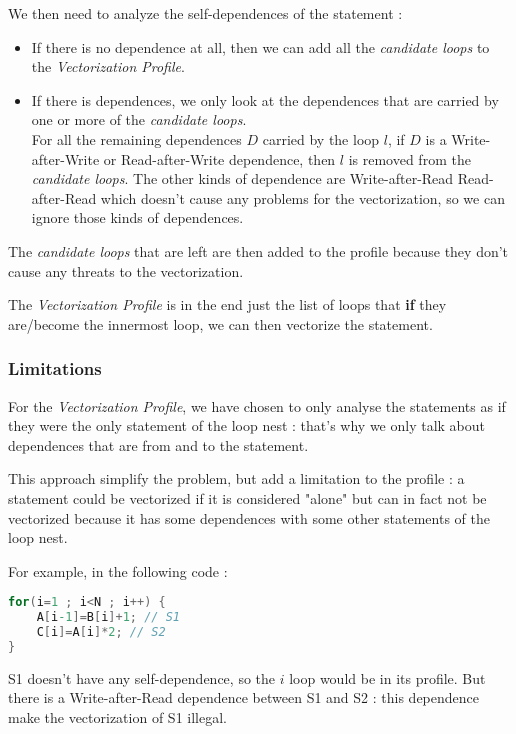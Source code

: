\documentclass[paper=a4, fontsize=11pt]{scrartcl}
\numberwithin{equation}{section}        %
\numberwithin{figure}{section}          %
\numberwithin{table}{section}               %
\begin{document}
        \bigskip

        We then need to analyze the \glspl{self-dependence} of the statement :
        \begin{itemize}
            \item If there is no dependence at all, then we can add all the 
                \textit{candidate loops} to the \textit{Vectorization Profile}.
            \item If there is dependences, we only look at the dependences that
                are carried by one or more of the \textit{candidate loops}.\\
                For all the remaining dependences $D$ carried by the loop $l$,
                if $D$ is a Write-after-Write or Read-after-Write dependence, then $l$
                is removed from the \textit{candidate loops}.
                The other kinds of dependence are Write-after-Read Read-after-Read 
                which doesn't cause any problems for the vectorization, so we can ignore
                those kinds of dependences.
        \end{itemize}
        The \textit{candidate loops} that are left are then added to the profile because they
        don't cause any threats to the vectorization.

        \bigskip

        The \textit{Vectorization Profile} is in the end just the list of loops that
        \textbf{if} they are/become the innermost loop, we can then vectorize the statement.

        \subsubsection{Limitations}
        For the \textit{Vectorization Profile}, we have chosen to only analyse the statements
        as if they were the only statement of the loop nest : that's why we only talk
        about dependences that are from and to the statement.

        This approach simplify the problem, but add a limitation to the profile :
        a statement could be vectorized if it is considered "alone" but can in fact not
        be vectorized because it has some dependences with some other statements of the loop
        nest.

        For example, in the following code :
\begin{lstlisting}[frame=single, language=C, caption={Vectorization Profile limitation example}, label={lst:vectorization_limitation}]
for(i=1 ; i<N ; i++) {
    A[i-1]=B[i]+1; // S1
    C[i]=A[i]*2; // S2
}
\end{lstlisting}
    S1 doesn't have any \gls{self-dependence}, so the $i$ loop would be in its
    profile. But there is a Write-after-Read dependence between S1 and S2 : this dependence
    make the vectorization of S1 illegal.
\end{document}
